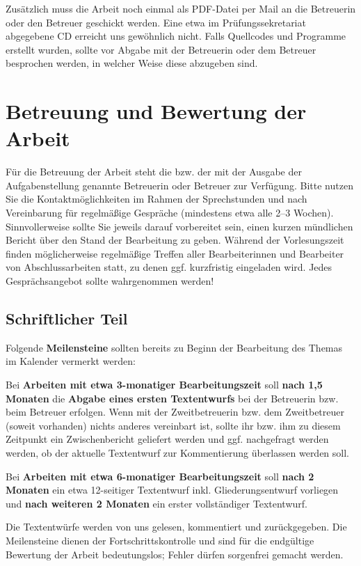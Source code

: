 \documentclass[
    fontsize=12pt,
    headings=small,
    parskip=half,           %
    bibliography=totoc,
    numbers=noenddot,       %
    open=any,               %
    ]{scrreprt}
\begin{document}
Zusätzlich muss die Arbeit noch einmal als PDF-Datei per Mail an die Betreuerin oder den Betreuer geschickt werden. Eine etwa im Prüfungssekretariat abgegebene CD erreicht uns gewöhnlich nicht. Falls Quellcodes und Programme erstellt wurden, sollte vor Abgabe mit der Betreuerin oder dem Betreuer besprochen werden, in welcher Weise diese abzugeben sind.

\chapter{Betreuung und Bewertung der Arbeit}

Für die Betreuung der Arbeit steht die bzw. der mit der Ausgabe der Aufgabenstellung genannte Betreuerin oder Betreuer zur Verfügung. Bitte nutzen Sie die Kontaktmöglichkeiten im Rahmen der Sprechstunden und nach Vereinbarung für regelmäßige Gespräche (mindestens etwa alle 2--3 Wochen). Sinnvollerweise sollte Sie jeweils darauf vorbereitet sein, einen kurzen mündlichen Bericht über den Stand der Bearbeitung zu geben. Während der Vorlesungszeit finden möglicherweise regelmäßige Treffen aller Bearbeiterinnen und Bearbeiter von Abschlussarbeiten statt, zu denen ggf. kurzfristig eingeladen wird. Jedes Gesprächsangebot sollte wahrgenommen werden!

\section{Schriftlicher Teil}

Folgende \textbf{Meilensteine} sollten bereits zu Beginn der Bearbeitung des Themas im Kalender vermerkt werden:

Bei \textbf{Arbeiten mit etwa 3-monatiger Bearbeitungszeit} soll \textbf{nach 1,5 Monaten} die \textbf{Abgabe eines ersten Textentwurfs} bei der Betreuerin bzw. beim Betreuer erfolgen. Wenn mit der Zweitbetreuerin bzw. dem Zweitbetreuer (soweit vorhanden) nichts anderes vereinbart ist, sollte ihr bzw. ihm zu diesem Zeitpunkt ein Zwischenbericht geliefert werden und ggf. nachgefragt werden werden, ob der aktuelle Textentwurf zur Kommentierung überlassen werden soll.

Bei \textbf{Arbeiten mit etwa 6-monatiger Bearbeitungszeit} soll \textbf{nach 2 Monaten} ein etwa 12-seitiger Textentwurf inkl. Gliederungsentwurf vorliegen und \textbf{nach weiteren 2 Monaten} ein erster vollständiger Textentwurf.

Die Textentwürfe werden von uns gelesen, kommentiert und zurückgegeben. Die Meilensteine dienen der Fortschrittskontrolle und sind für die endgültige Bewertung der Arbeit bedeutungslos; Fehler dürfen sorgenfrei gemacht werden.
\end{document}
